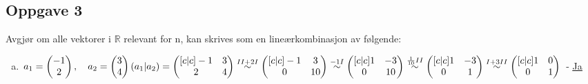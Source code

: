 \documentclass{article}
\newcommand{\vect}[1]{\begin{pmatrix} #1 \end{pmatrix}}
\newcommand{\uu}[1]{\underline{\underline{#1}}}
\newcommand{\eqto}[1]{\overset{#1}{\sim}}
\newcommand{\eqqto}[1]{\overset{\substack{#1}}{\sim}}
\begin{document}
\subsection*{Oppgave 3}
Avgjør om alle vektorer i $\mathbb{R}$ relevant for n, kan skrives som en lineærkombinasjon av følgende:
\begin{enumerate}[a)]
    \item \(a_1=\vect{-1\\2}, \quad a_2=\vect{3\\4} \\\\\\ 
    (a_1|a_2) = 
    \begin{pmatrix}[c|c]
        -1&3\\
        2&4
    \end{pmatrix}
    \eqqto{II+2I\\}
    \begin{pmatrix}[c|c]
        -1&3\\
        0&10
    \end{pmatrix}
    \eqto{-1I}
    \begin{pmatrix}[c|c]
        1&-3\\
        0&10
    \end{pmatrix}
    \eqqto{\frac{1}{10}II}
    \begin{pmatrix}[c|c]
        1&-3\\
        0&1
    \end{pmatrix}
    \eqqto{I+3II}
    \begin{pmatrix}[c|c]
        1&0\\
        0&1
    \end{pmatrix}
    \\\\\)
    - \uu{Ja}


\end{enumerate}
\end{document}
